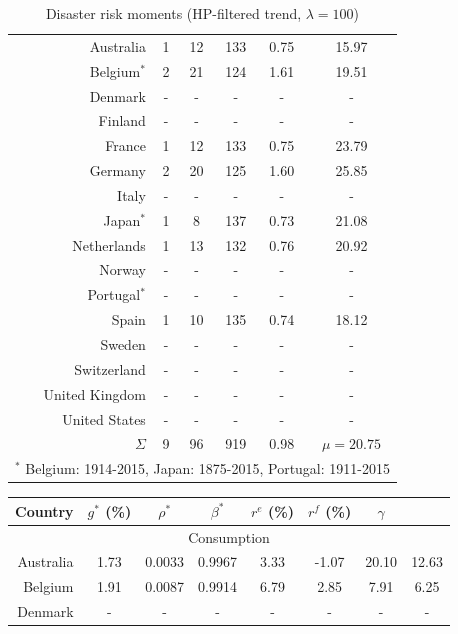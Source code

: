 {{{{{{{{{\begin{table}[H]
\begin{center}
\begin{tabular}{rccccc}
\hline
Australia & 1 & 12 & 133 & 0.75 & 15.97\\
Belgium$^{*}$ & 2 & 21 & 124 & 1.61 & 19.51\\
Denmark & - & - & - & - & -\\
Finland & - & - & - & - & -\\
France & 1 & 12 & 133 & 0.75 & 23.79\\
Germany & 2 & 20 & 125 & 1.60 & 25.85\\
Italy & - & - & - & - & -\\
Japan$^{*}$ & 1 & 8 & 137 & 0.73 & 21.08\\
Netherlands & 1 & 13 & 132 & 0.76 & 20.92\\
Norway & - & - & - & - & -\\
Portugal$^{*}$ & - & - & - & - & -\\
Spain & 1 & 10 & 135 & 0.74 & 18.12\\
Sweden & - & - & - & - & -\\
Switzerland & - & - & - & - & -\\
United Kingdom & - & - & - & - & -\\
United States & - & - & - & - & -\\
\hline
$\Sigma$ & 9 & 96 & 919 & 0.98 & $\mu=20.75$\\
\hline
\hline
\multicolumn{6}{c}{$^{*}$ Belgium: 1914-2015, Japan: 1875-2015, Portugal: 1911-2015}
\end{tabular} 
\end{center}
\caption{Disaster risk moments (HP-filtered trend, $\lambda=100$)}
\label{tab:disaster_risk_HP}
\end{table}


{\renewcommand{\arraystretch}{1.0}
\begin{table}[H]
\begin{center}
\begin{tabular}{rccccccc}
\hline
\hline
Country & $g^{*}$ (\%) & $\rho^{*}$ & $\beta^{*}$ & $r^{e}$ (\%) & $r^{f}$ (\%) & \underline{$\gamma$} & \boldsymbol{$\gamma$}\\
\hline
\multicolumn{8}{c}{Consumption}\\
\hline

Australia & 1.73 & 0.0033 & 0.9967 & 3.33 & -1.07 & 20.10 & 12.63\\ 

Belgium & 1.91 & 0.0087 & 0.9914 & 6.79 & 2.85 & 7.91 &  6.25\\ 

Denmark & - & - & - & - & - & - &  -\\ 


\end{tabular}
\end{center}
\end{table}}}}}}}}}}}
